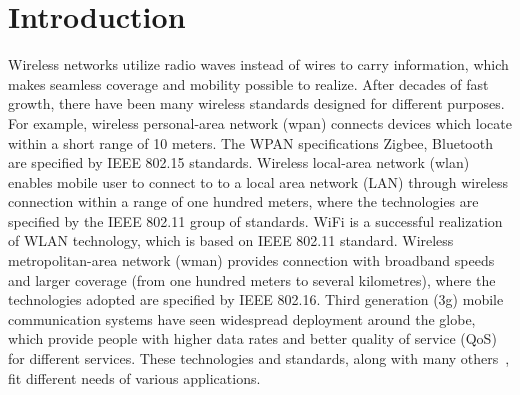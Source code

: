 \chapter{Introduction}
\label{INTRODUCTION}

Wireless networks utilize radio waves instead of wires to carry information, which makes seamless coverage and mobility possible to realize.
After decades of fast growth, there have been many wireless standards designed for different purposes.
For example, wireless personal-area network (\gls{wpan}) connects devices which locate within a short range of 10 meters.
The WPAN specifications \ie Zigbee, Bluetooth are specified by IEEE 802.15 standards.
Wireless local-area network (\gls{wlan}) enables mobile user to connect to to a local area network (LAN) through wireless connection within a range of one hundred meters, where the technologies are specified by the IEEE 802.11 group of standards.
WiFi is a successful realization of WLAN technology, which is based on IEEE 802.11 standard.
Wireless metropolitan-area network (\gls{wman}) provides connection with broadband speeds and larger coverage (from one hundred meters to several kilometres), where the technologies adopted are specified by IEEE 802.16.
Third generation (\gls{3g}) mobile communication systems have seen widespread deployment around the globe, which provide people with higher data rates and better quality of service (\gls{QoS}) for different services.
These technologies and standards, along with many others~\cite{Molisch:2011:WC:1984860}, fit different needs of various applications.


